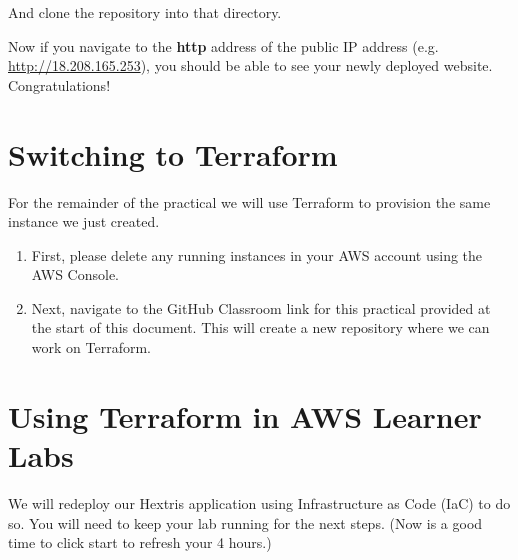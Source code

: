 \documentclass{csse4400}
\begin{document}
And clone the repository into that directory.



Now if you navigate to the \textbf{http} address of the public IP address (e.g. \url{http://18.208.165.253}), you should be able to see your newly deployed website.
Congratulations!




\section{Switching to Terraform}

For the remainder of the practical we will use Terraform to provision the same instance we just created.

\begin{enumerate}
    \item First, please delete any running instances in your AWS account using the AWS Console.
    \item Next, navigate to the GitHub Classroom link for this practical provided at the start of this document.
          This will create a new repository where we can work on Terraform.
\end{enumerate}


\section{Using Terraform in AWS Learner Labs}
We will redeploy our Hextris application using Infrastructure as Code (IaC) to do so.
You will need to keep your lab running for the next steps.
(Now is a good time to click start to refresh your 4 hours.)
\end{document}
